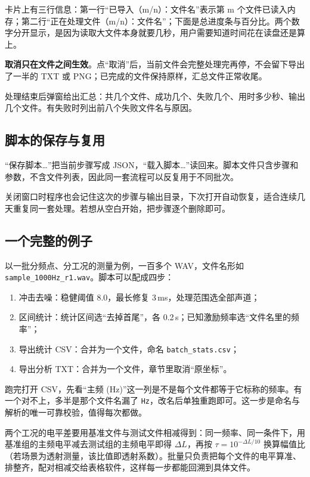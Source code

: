 \documentclass[UTF8,a4paper,12pt,scheme=chinese]{ctexart}
\begin{document}
卡片上有三行信息：第一行“已导入（m/n）：文件名”表示第 m 个文件已读入内存；第二行“正在处理文件（m/n）：文件名”；下面是总进度条与百分比。两个数字分开显示，是因为读取大文件本身就要几秒，用户需要知道时间花在读盘还是算上。

\textbf{取消只在文件之间生效}。点“取消”后，当前文件会完整处理完再停，不会留下导出了一半的 TXT 或 PNG；已完成的文件保持原样，汇总文件正常收尾。

处理结束后弹窗给出汇总：共几个文件、成功几个、失败几个、用时多少秒、输出几个文件。有失败时列出前八个失败文件名与原因。

\subsection{脚本的保存与复用}

“保存脚本…”把当前步骤写成 JSON，“载入脚本…”读回来。脚本文件只含步骤和参数，不含文件列表，因此同一套流程可以反复用于不同批次。

关闭窗口时程序也会记住这次的步骤与输出目录，下次打开自动恢复，适合连续几天重复同一套处理。若想从空白开始，把步骤逐个删除即可。

\subsection{一个完整的例子}

以一批分频点、分工况的测量为例，一百多个 WAV，文件名形如 \texttt{sample\_\allowbreak 1000Hz\_\allowbreak r1.wav}。脚本可以配成四步：

\begin{enumerate}
  \item 冲击去噪：稳健阈值 8.0，最长修复 3\,ms，处理范围选全部声道；
  \item 区间统计：统计区间选“去掉首尾”，各 0.2\,s；已知激励频率选“文件名里的频率”；
  \item 导出统计 CSV：合并为一个文件，命名 \texttt{batch\_stats.csv}；
  \item 导出分析 TXT：合并为一个文件，章节里取消“原坐标”。
\end{enumerate}

跑完打开 CSV，先看“主频 (Hz)”这一列是不是每个文件都等于它标称的频率。有一个对不上，多半是那个文件名漏了 \texttt{Hz}，改名后单独重跑即可。这一步是命名与解析的唯一可靠校验，值得每次都做。

两个工况的电平差要用基准文件与测试文件相减得到：同一频率、同一条件下，用基准组的主频电平减去测试组的主频电平即得 $\Delta L$，再按 $\tau = 10^{-\Delta L/10}$ 换算幅值比（若场景为透射测量，该比值即透射系数）。批量只负责把每个文件的电平算准、排整齐，配对相减交给表格软件，这样每一步都能回溯到具体文件。
\end{document}
